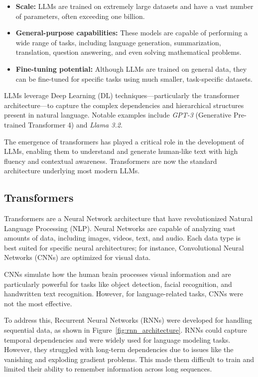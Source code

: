 \begin{itemize}
    \item \textbf{Scale:} LLMs are trained on extremely large datasets and have a vast number of parameters, often exceeding one billion.
    \item \textbf{General-purpose capabilities:} These models are capable of performing a wide range of tasks, including language generation, summarization, translation, question answering, and even solving mathematical problems.
    \item \textbf{Fine-tuning potential:} Although LLMs are trained on general data, they can be fine-tuned for specific tasks using much smaller, task-specific datasets.
\end{itemize}

LLMs leverage Deep Learning (DL) techniques—particularly the transformer architecture—to capture the complex dependencies and hierarchical structures present in natural language. Notable examples include \textit{GPT-3} (Generative Pre-trained Transformer 4) and \textit{Llama 3.2}.

The emergence of transformers has played a critical role in the development of LLMs, enabling them to understand and generate human-like text with high fluency and contextual awareness. Transformers are now the standard architecture underlying most modern LLMs.

\subsection*{Transformers}
\label{sssec:transformers}

Transformers are a Neural Network architecture that have revolutionized Natural Language Processing (NLP). Neural Networks are capable of analyzing vast amounts of data, including images, videos, text, and audio. Each data type is best suited for specific neural architectures; for instance, Convolutional Neural Networks (CNNs) are optimized for visual data.

CNNs simulate how the human brain processes visual information and are particularly powerful for tasks like object detection, facial recognition, and handwritten text recognition. However, for language-related tasks, CNNs were not the most effective.

To address this, Recurrent Neural Networks (RNNs) were developed for handling sequential data, as shown in Figure~\ref{fig:rnn_architecture}. RNNs could capture temporal dependencies and were widely used for language modeling tasks. However, they struggled with long-term dependencies due to issues like the vanishing and exploding gradient problems. This made them difficult to train and limited their ability to remember information across long sequences.

